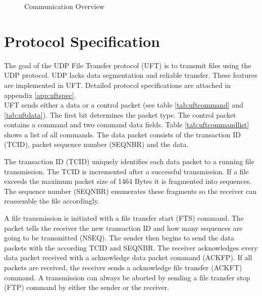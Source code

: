 \vspace{2em}
\begin{figure}[h!]
    \centering
    
    \caption{Communication Overview}
    \label{fig:commoverview}
\end{figure}
\clearpage

%
%
\section{Protocol Specification} \label{chapt:protospec}
The goal of the UDP File Transfer protocol (UFT) is to transmit files using
the UDP protocol. UDP lacks data segmentation and reliable transfer. These
features are implemented in UFT. Detailed protocol specifications are attached
in appendix \ref{app:uftspec}.\\

UFT sends either a data or a control packet (see table \ref{tab:uftcommand} and \ref{tab:uftdata}). The first bit determines the packet
type. The control packet contains a command and two command data fields. Table \ref{tab:uftcommandlist} shows a list of
all commands. The
data packet consists of the transaction ID (TCID), packet sequence number 
(SEQNBR) and the data.

The transaction ID (TCID) uniquely identifies each data packet to a running file
transmission. The TCID is incremented after a successful transmission. If a file
exceeds the maximum packet size of 1464 Bytes it is fragmented into sequences.
The sequence number (SEQNBR) enumerates these fragments so the receiver can
reassemble the file accordingly.

A file transmission is initiated with a file transfer start (FTS) command. The
packet tells the receiver the new transaction ID and how many sequences are
going to be transmitted (NSEQ). The sender then begins to send the data packets
with the according TCID and SEQNBR. The receiver acknowledges every
data packet received with a acknowledge data packet command (ACKFP). If all packets are
received, the receiver sends a acknowledge file transfer (ACKFT) command. A
transmission can always be aborted by sending a file transfer stop (FTP) command
by either the sender or the receiver.

